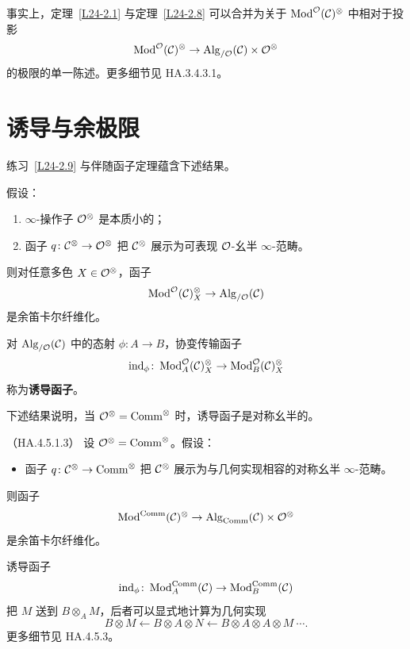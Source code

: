 \begin{remark}\label{L24-2.10}
事实上，定理~\ref{L24-2.1} 与定理~\ref{L24-2.8} 可以合并为关于 $\operatorname{Mod}^{\mathcal{O}}(\mathcal{C})^{\otimes}$ 中相对于投影
\[
\operatorname{Mod}^{\mathcal{O}}(\mathcal{C})^{\otimes}\to\operatorname{Alg}_{/\mathcal{O}}(\mathcal{C})\times\mathcal{O}^{\otimes}
\]
的极限的单一陈述。更多细节见 HA.3.4.3.1。
\end{remark}

\section{诱导与余极限}

\nitem\label{L24-3.1} 练习~\ref{L24-2.9} 与伴随函子定理蕴含下述结果。

\begin{corollary}\label{L24-3.2}
假设：
\begin{enumerate}[label=(\roman*),leftmargin=2.4em,itemsep=0.1em]
\item $\infty$-操作子 $\mathcal{O}^{\otimes}$ 是本质小的；
\item 函子 $q\colon\mathcal{C}^{\otimes}\to\mathcal{O}^{\otimes}$ 把 $\mathcal{C}^{\otimes}$ 展示为可表现 $\mathcal{O}$-幺半 $\infty$-范畴。
\end{enumerate}
则对任意多色 $X\in\mathcal{O}^{\otimes}$，函子
\[
\operatorname{Mod}^{\mathcal{O}}(\mathcal{C})^{\otimes}_{X}\to\operatorname{Alg}_{/\mathcal{O}}(\mathcal{C})
\]
是余笛卡尔纤维化。
\end{corollary}

\begin{remark}\label{L24-3.3}
对 $\operatorname{Alg}_{/\mathcal{O}}(\mathcal{C})$ 中的态射 $\phi\colon A\to B$，协变传输函子
\[
\operatorname{ind}_{\phi}\colon\operatorname{Mod}^{\mathcal{O}}_{A}(\mathcal{C})^{\otimes}_{X}\to\operatorname{Mod}^{\mathcal{O}}_{B}(\mathcal{C})^{\otimes}_{X}
\]
称为\textbf{诱导函子}。
\end{remark}

\nitem\label{L24-3.4} 下述结果说明，当 $\mathcal{O}^{\otimes}=\mathrm{Comm}^{\otimes}$ 时，诱导函子是对称幺半的。

\begin{theorem}\label{L24-3.5}（HA.4.5.1.3）
设 $\mathcal{O}^{\otimes}=\mathrm{Comm}^{\otimes}$。假设：
\begin{itemize}[leftmargin=2.2em,itemsep=0.1em]
\item 函子 $q\colon\mathcal{C}^{\otimes}\to\mathrm{Comm}^{\otimes}$ 把 $\mathcal{C}^{\otimes}$ 展示为与几何实现相容的对称幺半 $\infty$-范畴。
\end{itemize}
则函子
\[
\operatorname{Mod}^{\mathrm{Comm}}(\mathcal{C})^{\otimes}\to\operatorname{Alg}_{\mathrm{Comm}}(\mathcal{C})\times\mathcal{O}^{\otimes}
\]
是余笛卡尔纤维化。
\end{theorem}

\begin{remark}\label{L24-3.6}
诱导函子
\[
\operatorname{ind}_{\phi}\colon\operatorname{Mod}^{\mathrm{Comm}}_{A}(\mathcal{C})\to\operatorname{Mod}^{\mathrm{Comm}}_{B}(\mathcal{C})
\]
把 $M$ 送到 $B\otimes_{A}M$，后者可以显式地计算为几何实现
\[
B\otimes M\longleftarrow B\otimes A\otimes N\longleftarrow B\otimes A\otimes A\otimes M\ \cdots.
\]
更多细节见 HA.4.5.3。
\end{remark}

